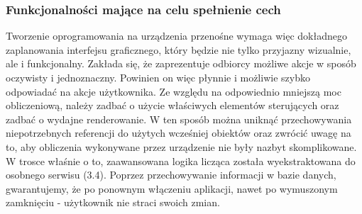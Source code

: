  \subsubsection{Funkcjonalności mające na celu spełnienie cech}
 Tworzenie oprogramowania na urządzenia przenośne wymaga więc dokładnego zaplanowania interfejsu graficznego, który będzie nie tylko przyjazny wizualnie, ale i funkcjonalny. Zakłada się, że zaprezentuje odbiorcy możliwe akcje w sposób oczywisty i jednoznaczny. Powinien on więc płynnie i możliwie szybko odpowiadać na akcje użytkownika. Ze względu na odpowiednio mniejszą moc obliczeniową, należy zadbać o użycie właściwych elementów sterujących oraz zadbać o wydajne renderowanie. W ten sposób można uniknąć przechowywania niepotrzebnych referencji do użytych wcześniej obiektów oraz zwrócić uwagę na to, aby obliczenia wykonywane przez urządzenie nie były nazbyt skomplikowane. W trosce właśnie o to, zaawansowana logika licząca została wyekstraktowana do osobnego serwisu (3.4). Poprzez przechowywanie informacji w bazie danych, gwarantujemy, że po ponownym włączeniu aplikacji, nawet po wymuszonym zamknięciu - użytkownik nie straci swoich zmian.